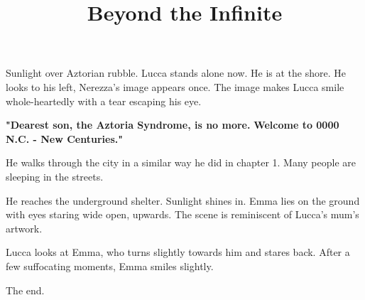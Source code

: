 \documentclass[11pt]{article}
\begin{document}
\ttfamily
\title{Beyond the Infinite}
\maketitle

Sunlight over Aztorian rubble.
Lucca stands alone now. 
He is at the shore.
He looks to his left, Nerezza's image appears once.
The image makes Lucca smile whole-heartedly with a tear escaping his eye.

\textbf{"Dearest son, the Aztoria Syndrome, is no more.}
\textbf{Welcome to 0000 N.C. - New Centuries."}

He walks through the city in a similar way he did in chapter 1.
Many people are sleeping in the streets. 

He reaches the underground shelter.
Sunlight shines in. 
Emma lies on the ground with eyes staring wide open, upwards.
The scene is reminiscent of Lucca's mum's artwork.

Lucca looks at Emma, who turns slightly towards him and stares back.
After a few suffocating moments, Emma smiles slightly.

The end.
\end{document}

